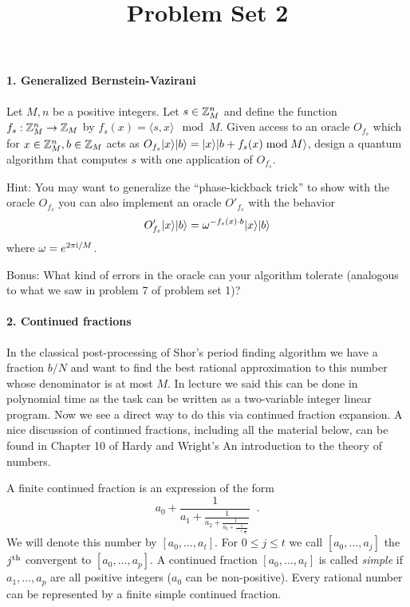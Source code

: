 


\title{Problem Set 2}
\date{}
\maketitle

\paragraph*{1. Generalized Bernstein-Vazirani}
Let $M,n$ be a positive integers.  Let $s \in \mathbb{Z}_M^n$ and define the 
function $f_s : \mathbb{Z}_M^n \rightarrow \mathbb{Z}_M$ by $f_s(x) = \langle s, x \rangle \mod M$.  
Given access to an oracle $O_{f_s}$ which for $x \in \mathbb{Z}_M^n , b \in \mathbb{Z}_M$ acts as 
$O_{f_s} |x\rangle |b\rangle = |x\rangle |b + f_s(x) \bmod M\rangle$, design a 
quantum algorithm that computes $s$ with one application of $O_{f_s}$.  

Hint: You may want to generalize the ``phase-kickback trick'' to show with the oracle 
$O_{f_s}$ you can also implement an oracle $O'_{f_s}$ with the behavior
\[
O'_{f_s} |x\rangle|b\rangle = \omega^{-f_s(x) \cdot b} |x\rangle|b\rangle 
\]
where $\omega = e^{2\pi \mathrm{i}/M}$.  

Bonus: What kind of errors in the oracle can your algorithm tolerate (analogous to what we saw in problem 7 of 
problem set 1)?

\paragraph*{2. Continued fractions}
In the classical post-processing of Shor's period finding algorithm we have a fraction $b/N$ and want to find the 
best rational approximation to this number whose denominator is at most $M$.  In lecture we said this can be 
done in polynomial time as the task can be written as a two-variable integer linear program.  Now we see a direct 
way to do this via continued fraction expansion.  A nice discussion of continued fractions, including all the material 
below, can be found in Chapter 10 of Hardy and Wright's An introduction to the theory of numbers.

A finite continued fraction is an expression of the form
\[
a_0 + \frac{1}{a_1 + \frac{1}{a_2 + \frac{1}{a_3 + \frac{1}{\cdots + \frac{1}{a_t}}}}} \enspace.
\]
We will denote this number by $[a_0, \ldots, a_t]$.  For $0 \le j \le t$ we call $[a_0, \ldots, a_j]$ the 
$j^{\scriptsize \mbox{{\rm th}}}$ convergent to $[a_0, \ldots, a_p]$.  A continued fraction $[a_0, \ldots, a_t]$ is called \emph{simple}
if $a_1, \ldots, a_p$ are all positive integers ($a_0$ can be non-positive).  Every rational number can be represented by a finite simple 
continued fraction.

